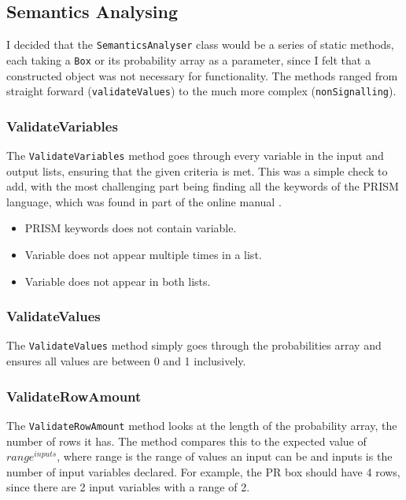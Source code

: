 \documentclass[report.tex]{subfiles}
\begin{document}
\subsection{Semantics Analysing} %
\label{sub:semantics_analysing}
I decided that the \texttt{SemanticsAnalyser} class would be a series of static
methods, each taking a \texttt{Box} or its probability array as a parameter,
since I felt that a constructed object was not necessary for functionality. The
methods ranged from straight forward (\texttt{validateValues}) to the much more
complex (\texttt{nonSignalling}).

\subsubsection{ValidateVariables} %
\label{ssub:validateVariables}
The \texttt{ValidateVariables} method goes through every variable in the input
and output lists, ensuring that the given criteria is met. This was a simple
check to add, with the most challenging part being finding all the keywords of
the PRISM language, which was found in part of the online manual
\cite{prism_keywords}.
\begin{itemize}
    \item PRISM keywords does not contain variable.
    \item Variable does not appear multiple times in a list.
    \item Variable does not appear in both lists.
\end{itemize}

\subsubsection{ValidateValues} %
\label{ssub:validatevalues}
The \texttt{ValidateValues} method simply goes through the probabilities array
and ensures all values are between 0 and 1 inclusively.

\subsubsection{ValidateRowAmount} %
\label{ssub:validaterowamount}
The \texttt{ValidateRowAmount} method looks at the length of the probability
array, the number of rows it has. The method compares this to the expected
value of \(range ^{inputs}\), where range is the range of values an input can be
and inputs is the number of input variables declared. For example, the PR box
should have 4 rows, since there are 2 input variables with a range of 2.
\end{document}
